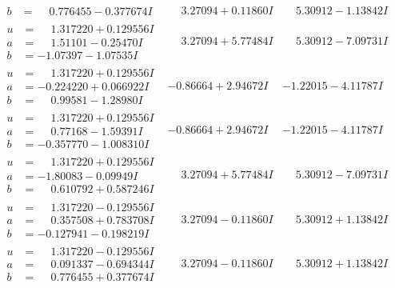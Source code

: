 \documentclass[1p]{elsarticle_modified}
\theoremstyle{definition}
\begin{document}
$$\begin{array}{c|c|c}
\begin{aligned}
b &= \phantom{-}0.776455 - 0.377674 I\end{aligned}
 & \phantom{-}3.27094 + 0.11860 I & \phantom{-}5.30912 - 1.13842 I \\ \hline\begin{aligned}
u &= \phantom{-}1.317220 + 0.129556 I \\
a &= \phantom{-}1.51101 - 0.25470 I \\
b &= -1.07397 - 1.07535 I\end{aligned}
 & \phantom{-}3.27094 + 5.77484 I & \phantom{-}5.30912 - 7.09731 I \\ \hline\begin{aligned}
u &= \phantom{-}1.317220 + 0.129556 I \\
a &= -0.224220 + 0.066922 I \\
b &= \phantom{-}0.99581 - 1.28980 I\end{aligned}
 & -0.86664 + 2.94672 I & -1.22015 - 4.11787 I \\ \hline\begin{aligned}
u &= \phantom{-}1.317220 + 0.129556 I \\
a &= \phantom{-}0.77168 - 1.59391 I \\
b &= -0.357770 - 1.008310 I\end{aligned}
 & -0.86664 + 2.94672 I & -1.22015 - 4.11787 I \\ \hline\begin{aligned}
u &= \phantom{-}1.317220 + 0.129556 I \\
a &= -1.80083 - 0.09949 I \\
b &= \phantom{-}0.610792 + 0.587246 I\end{aligned}
 & \phantom{-}3.27094 + 5.77484 I & \phantom{-}5.30912 - 7.09731 I \\ \hline\begin{aligned}
u &= \phantom{-}1.317220 - 0.129556 I \\
a &= \phantom{-}0.357508 + 0.783708 I \\
b &= -0.127941 - 0.198219 I\end{aligned}
 & \phantom{-}3.27094 - 0.11860 I & \phantom{-}5.30912 + 1.13842 I \\ \hline\begin{aligned}
u &= \phantom{-}1.317220 - 0.129556 I \\
a &= \phantom{-}0.091337 - 0.694344 I \\
b &= \phantom{-}0.776455 + 0.377674 I\end{aligned}
 & \phantom{-}3.27094 - 0.11860 I & \phantom{-}5.30912 + 1.13842 I \\ \hline\begin{aligned}

\end{aligned}
\end{array}$$
\end{document}
